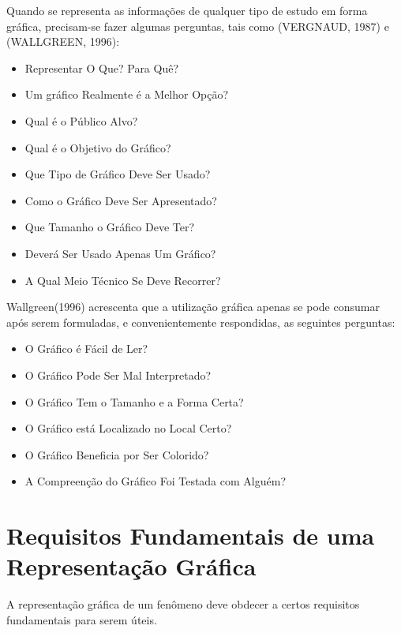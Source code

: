 \newpage
Quando se representa as informações de qualquer tipo de estudo em forma gráfica, precisam-se fazer algumas perguntas, tais como (VERGNAUD, 1987) e (WALLGREEN, 1996):

\begin{itemize}
\item Representar O Que? Para Quê?
\item Um gráfico Realmente é a Melhor Opção?
\item Qual é o Público Alvo?
\item Qual é o Objetivo do Gráfico?
\item Que Tipo de Gráfico Deve Ser Usado?
\item Como o Gráfico Deve Ser Apresentado?
\item Que Tamanho o Gráfico Deve Ter?
\item Deverá Ser Usado Apenas Um Gráfico?
\item A Qual Meio Técnico Se Deve Recorrer?
\end{itemize}

Wallgreen(1996) acrescenta que a utilização gráfica apenas se pode consumar após serem formuladas, e convenientemente respondidas, as seguintes perguntas:

\begin{itemize}
\item O Gráfico é Fácil de Ler? 
\item O Gráfico Pode Ser Mal Interpretado? 
\item O Gráfico Tem o Tamanho e a Forma Certa? 
\item O Gráfico está Localizado no Local Certo? 
\item O Gráfico Beneficia por Ser Colorido? 
\item A Compreenção do Gráfico Foi Testada com Alguém?
\end{itemize}


\newpage
\section{Requisitos Fundamentais de uma Representação Gráfica}

A representação gráfica de um fenômeno deve obdecer a certos requisitos fundamentais para serem úteis.

